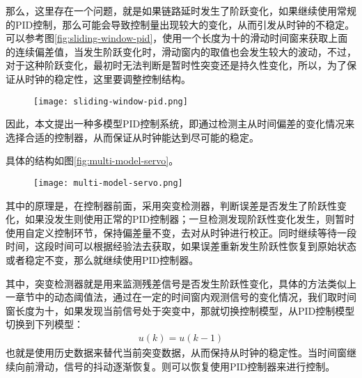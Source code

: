 那么，这里存在一个问题，就是如果链路延时发生了阶跃变化，如果继续使用常规的PID控制，那么可能会导致控制量出现较大的变化，从而引发从时钟的不稳定。可以参考图\ref{fig:sliding-window-pid}，使用一个长度为十的滑动时间窗来获取上面的连续偏差值，当发生阶跃变化时，滑动窗内的取值也会发生较大的波动，不过，对于这种阶跃变化，最初时无法判断是暂时性突变还是持久性变化，所以，为了保证从时钟的稳定性，这里要调整控制结构。
\begin{figure}[htbp]
  \centering
  \begin{minipage}[b]{0.7\textwidth}
   \captionstyle{\centering}
   \centering
   \texttt{[image: sliding-window-pid.png]}
  \end{minipage}     
\end{figure}

因此，本文提出一种多模型PID控制系统，即通过检测主从时间偏差的变化情况来选择合适的控制器，从而保证从时钟能达到尽可能的稳定。

具体的结构如图\ref{fig:multi-model-servo}。
\begin{figure}[htbp]
  \centering
  \begin{minipage}[b]{0.7\textwidth}
   \captionstyle{\centering}
   \centering
   \texttt{[image: multi-model-servo.png]}
  \end{minipage}     
\end{figure}

其中的原理是，在控制器前面，采用突变检测器，判断误差是否发生了阶跃性变化，如果没发生则使用正常的PID控制器；一旦检测发现阶跃性变化发生，则暂时使用自定义控制环节，保持偏差量不变，去对从时钟进行校正。同时继续等待一段时间，这段时间可以根据经验法去获取，如果误差重新发生阶跃性恢复到原始状态或者稳定不变，那么就继续使用PID控制器。

其中，突变检测器就是用来监测残差信号是否发生阶跃性变化，具体的方法类似上一章节中的动态阈值法，通过在一定的时间窗内观测信号的变化情况，我们取时间窗长度为十，如果发现当前信号处于突变中，那就切换控制模型，从PID控制模型切换到下列模型：
\begin {align}
u(k) = u(k-1)
\end{align}
也就是使用历史数据来替代当前突变数据，从而保持从时钟的稳定性。当时间窗继续向前滑动，信号的抖动逐渐恢复。则可以恢复使用PID控制器来进行控制。

